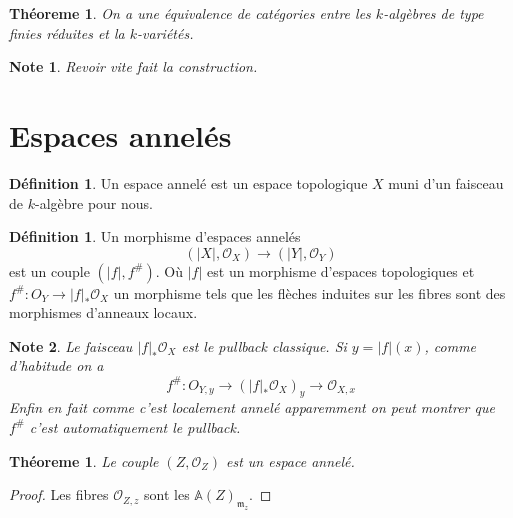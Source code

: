 \documentclass[a4paper,12pt]{book}
\newcommand{\A}{\mathbb{A}}
\newcommand{\Or}{\mathcal{O}}
\newcommand{\m}{\mathfrak{m}}
\theoremstyle{plain}
\newtheorem{thm}[subsection]{Théoreme}
\newtheorem{note}{Note}
\theoremstyle{definition}
\newtheorem{defn}[subsection]{Définition}
\theoremstyle{remark}
\begin{document}
\begin{thm}
    On a une équivalence de catégories entre les $k$-algèbres
    de type finies réduites et la $k$-variétés.
\end{thm}
\begin{note}
    Revoir vite fait la construction.
\end{note}
\section{Espaces annelés}
\begin{defn}
    Un espace annelé est un espace topologique $X$ muni d'un faisceau
    de $k$-algèbre pour nous.
\end{defn}

\begin{defn}
    Un morphisme d'espaces annelés 
    \[(|X|,\Or_X)\to (|Y|, \Or_Y)\] 
    est un couple $(|f|, f^{\#})$. Où 
    $|f|$ est un morphisme d'espaces topologiques et
    $f^{\#}\colon O_Y\to |f|_*\Or_X$
    un morphisme tels que les flèches induites sur 
    les fibres sont des morphismes d'anneaux 
    locaux.
\end{defn}
\begin{note}
    Le faisceau $|f|_*\Or_X$ est le pullback classique. Si
    $y=|f|(x)$, comme d'habitude on a 
    \[f^\#\colon O_{Y,y}\to (|f|_*\Or_X)_y\to \Or_{X,x}\]
    Enfin en fait comme c'est localement annelé apparemment on 
    peut montrer que $f^\#$ c'est automatiquement le pullback.
\end{note}
\begin{thm}
    Le couple $(Z,\Or_Z)$ est un espace annelé.
\end{thm}
\begin{proof}
    Les fibres $\Or_{Z,z}$ sont les $\A(Z)_{\m_z}$.
\end{proof}

\printbibliography
\end{document}

